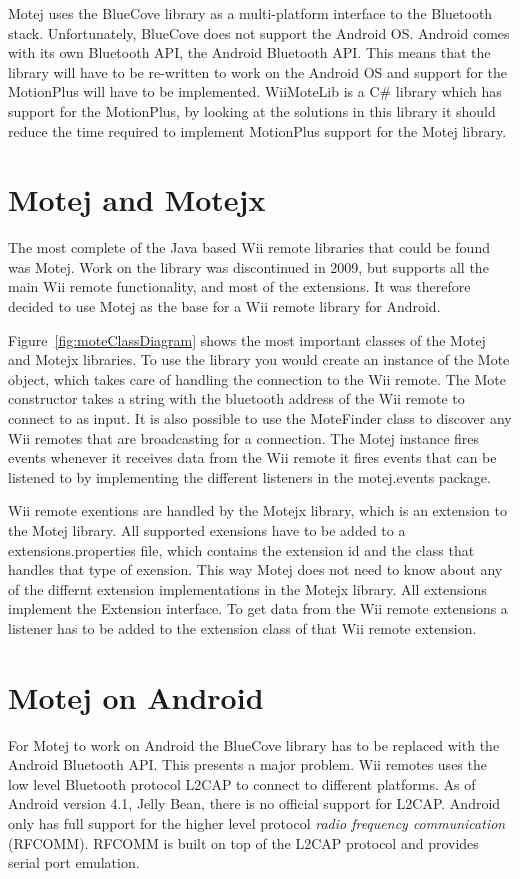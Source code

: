Motej uses the BlueCove library as a multi-platform interface to the Bluetooth stack. Unfortunately, BlueCove does not support the Android OS. Android comes with its own Bluetooth API, the Android Bluetooth API. This means that the library will have to be re-written to work on the Android OS and support for the MotionPlus will have to be implemented. WiiMoteLib\cite{wiiMoteLib} is a C\# library which has support for the MotionPlus, by looking at the solutions in this library it should reduce the time required to implement MotionPlus support for the Motej library.

\section{Motej and Motejx}
The most complete of the Java based Wii remote libraries that could be found was Motej. Work on the library was discontinued in 2009, but supports all the main Wii remote functionality, and most of the extensions. It was therefore decided to use Motej as the base for a Wii remote library for Android. 

Figure~\ref{fig:moteClassDiagram} shows the most important classes of the Motej and Motejx libraries. To use the library you would create an instance of the Mote object, which takes care of handling the connection to the Wii remote. The Mote constructor takes a string with the bluetooth address of the Wii remote to connect to as input. It is also possible to use the MoteFinder class to discover any Wii remotes that are broadcasting for a connection. The Motej instance fires events whenever it receives data from the Wii remote it fires events that can be listened to by implementing the different listeners in the motej.events package. 

Wii remote exentions are handled by the Motejx library, which is an extension to the Motej library. All supported exensions have to be added to a extensions.properties file, which contains the extension id and the class that handles that type of exension. This way Motej does not need to know about any of the differnt extension implementations in the Motejx library. All extensions implement the Extension interface. To get data from the Wii remote extensions a listener has to be added to the extension class of that Wii remote extension.

\section{Motej on Android}
For Motej to work on Android the BlueCove library has to be replaced with the Android Bluetooth API. This presents a major problem. Wii remotes uses the low level Bluetooth protocol L2CAP to connect to different platforms. As of Android version 4.1, Jelly Bean, \cite{jellyBean} there is no official support for L2CAP. Android only has full support for the higher level protocol \emph{radio frequency communication} (RFCOMM). RFCOMM is built on top of the L2CAP protocol and provides serial port emulation. 

